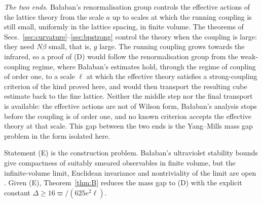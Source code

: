 \emph{The two ends.} Ba{\l}aban's renormalisation group
\cite{Bal84a,Bal85a,Bal89b} controls the effective actions of the lattice
theory from the scale $a$ up to scales at which the running coupling is still
small, uniformly in the lattice spacing, in finite volume. The theorems of
Secs.~\ref{sec:curvature}--\ref{sec:bpstrong} control the theory when the
coupling is large: they need $N\beta$ small, that is, $g$ large. The running
coupling grows towards the infrared, so a proof of (D) would follow the
renormalisation group from the weak-coupling regime, where Ba{\l}aban's
estimates hold, through the regime of coupling of order one, to a scale
$\ell$ at which the effective theory satisfies a strong-coupling criterion of
the kind proved here, and would then transport the resulting cube estimate
back to the fine lattice. Neither the middle step nor the final transport is
available: the effective actions are not of Wilson form, Ba{\l}aban's analysis
stops before the coupling is of order one, and no known criterion accepts the
effective theory at that scale. This gap between the two ends is the Yang--Mills
mass gap problem in the form isolated here.

Statement (E) is the construction problem. Ba{\l}aban's ultraviolet stability
bounds give compactness of suitably smeared observables in finite volume, but
the infinite-volume limit, Euclidean invariance and nontriviality of the limit
are open \cite{JW06}. Given (E), Theorem~\ref{thm:B} reduces the mass gap to
(D) with the explicit constant $\Delta\ge16\varpi/(625e^2\ell)$.

